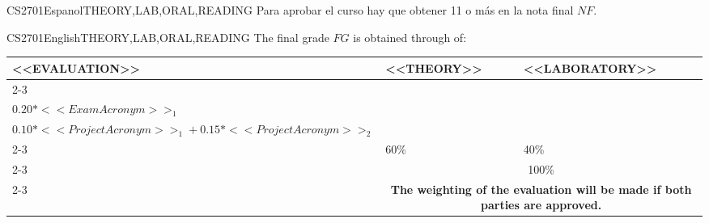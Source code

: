 \begin{evaluation}{CS2701}{Espanol}{THEORY,LAB,ORAL,READING}
  \noindent Para aprobar el curso hay que obtener 11 o más en la nota final $NF$.
  \end{evaluation}

   
  \begin{evaluation}{CS2701}{English}{THEORY,LAB,ORAL,READING}
  The final grade $FG$ is obtained through of:
 
  \begin{tabularx}{0.9\textwidth}{|X|p{}|p{}|} \hline
  \multirow{4}{*}{\uppercase{<<Evaluation>>}} & \uppercase{<<Theory>>} & \uppercase{<<Laboratory>>} \\ \cline{2-3}
  & %
      \begin{minipage}{0.95\textwidth}
      \begin{tabular}{l}
          $0.12*<<PracticalTestAcronym>>_{1} + 0.14*<<PracticalTestAcronym>>_{2} + 0.14*<<PracticalTestAcronym>>_{3}$ + \\  
          $0.20*<<ExamAcronym>>_{1}$
      \end{tabular} 
      \end{minipage} 
  & %
      \begin{minipage}{0.95\textwidth}
      \begin{tabular}{l}
          $0.07*<<ContinuousAssessmentAcronym>>_{1} + 0.08*<<ContinuousAssessmentAcronym>>_{2}$  +\\
          $0.10*<<ProjectAcronym>>_{1} + 0.15*<<ProjectAcronym>>_{2}$
          \end{tabular} 
      \end{minipage}                 \\ \cline{2-3}
  
  & %
  60\% 
  & %
  40\% \\ \cline{2-3}
  & \multicolumn{2}{c|}{100\%}  \\ \cline{2-3}
  & \multicolumn{2}{c|}{\textbf{The weighting of the evaluation will be made if both parties are approved.}}  \\ \hline
  \end{tabularx}
  

\end{evaluation}

